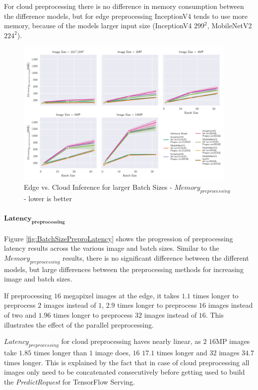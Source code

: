 For cloud preprocessing there is no difference in memory consumption between the difference models, but for edge preprocessing InceptionV4 tends to use more memory, because of the models larger input size (InceptionV4 $299^2$, MobileNetV2 $224^2$).


\begin{figure}[!htb]
\centering
\includegraphics[width=0.95\textwidth]{./Bilder/single_plots/batch_size_plots/Effects_of_Batch_size_Preprocessing_Memory.pdf}
\caption{Edge vs. Cloud Inference for larger Batch Sizes -  $Memory_{preprocessing}$ - lower is better}
\label{fig:BatchSizePreproMemory}
\end{figure}

\paragraph{$\mathbf{Latency_{preprocessing}}$}
Figure \ref{fig:BatchSizePreproLatency} shows the progression of preprocessing latency results across the various image and batch sizes.
Similar to the $Memory_{preprocessing}$ results, there is no significant difference between the different models, but large differences between the preprocessing methods for increasing image and batch sizes.

If preprocessing $16$ megapixel images at the edge, it takes $1.1$ times longer to preprocess $2$ images instead of $1$, $2.9$ times longer to preprocess $16$ images instead of two and $1.96$ times longer to preprocess $32$ images instead of $16$.
This illustrates the effect of the parallel preprocessing.

$Latency_{preprocessing}$ for cloud preprocessing haves nearly linear, as $2$ $16$MP images take $1.85$ times longer than $1$ image does, $16$ $17.1$ times longer and $32$ images $34.7$ times longer.
This is explained by the fact that in case of cloud preprocessing all images only need to be concatenated consecutively before getting used to build the \emph{PredictRequest} for TensorFlow Serving. 


